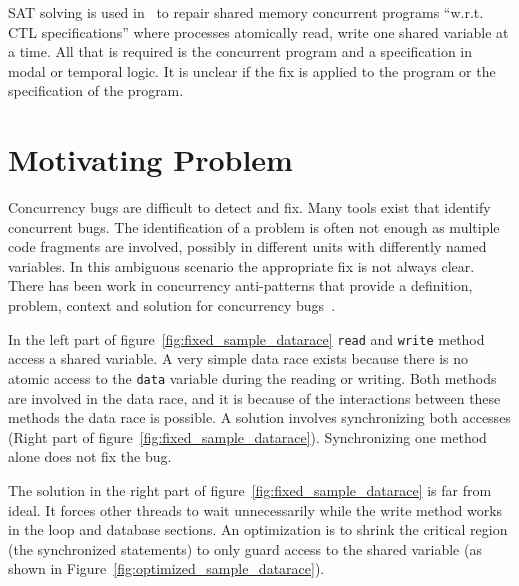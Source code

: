 \documentclass[10pt, conference, compsocconf]{IEEEtran}
\begin{document}
SAT solving is used in~\cite{AY07}  to repair shared memory concurrent programs
``w.r.t. CTL specifications'' where processes atomically read, write one shared
variable at a time. All that is required is the concurrent program and a
specification in modal or temporal logic. It is unclear if the fix is applied
to the program or the specification of the program.

\section{Motivating Problem}
\label{sec:motivation}

Concurrency bugs are difficult to detect and fix. Many
tools exist that identify concurrent bugs. The identification of a problem is
often not enough as multiple code fragments are involved, possibly in different
units with differently named variables. In this ambiguous scenario the
appropriate fix is not always clear. There has been work in concurrency
anti-patterns that provide a definition, problem, context and solution for
concurrency bugs~\cite{BJ09}.

In the left part of figure~\ref{fig:fixed_sample_datarace} \texttt{read} and
\texttt{write} method access a shared variable. A very simple data race
exists because there is no atomic
access to the \texttt{data} variable during the reading or writing. Both
methods are involved in the data race, and it is because of the interactions
between these methods the data race is possible. A solution involves
synchronizing both accesses (Right part of figure~\ref{fig:fixed_sample_datarace}).
Synchronizing one method alone does not fix the bug.

The solution in the right part of figure~\ref{fig:fixed_sample_datarace} is far
from ideal. It forces other threads to wait unnecessarily while the write method works in the loop and database
sections. An optimization is to shrink the critical region (the synchronized
statements) to only guard access to the shared variable (as shown in
Figure~\ref{fig:optimized_sample_datarace}).
\end{document}
